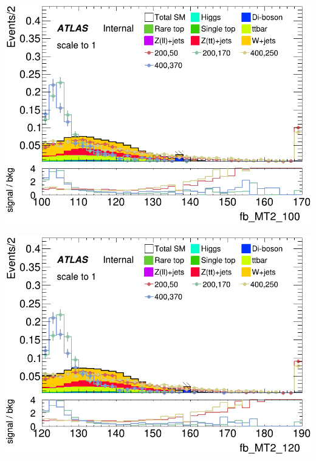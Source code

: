 \documentclass[usenames,dvipsnames]{beamer}
\begin{document}
\begin{frame}
    \begin{minipage}{0.32\textwidth}
        \centering
        \includegraphics[width=\textwidth]{graphics/LH_met_sig/LH_fb_MT2_100_norm.png}
    \end{minipage}
    \hfill
    \begin{minipage}{0.32\textwidth}
        \centering
        \includegraphics[width=\textwidth]{graphics/LH_met_sig/LH_fb_MT2_120_norm.png}
    \end{minipage}
    \hfill
    \begin{minipage}{0.32\textwidth}
        \centering

\end{minipage}
\end{frame}
\end{document}
